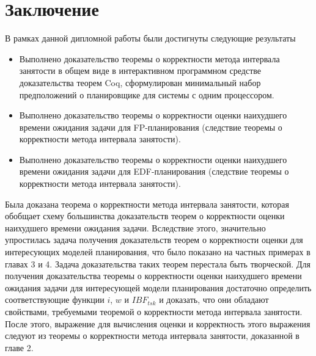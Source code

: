 \section*{Заключение}
В рамках данной дипломной работы были достигнуты следующие результаты
\begin{itemize}
    \item Выполнено доказательство теоремы о корректности метода интервала занятости в общем виде в интерактивном программном средстве доказательства теорем Coq, сформулирован минимальный набор предположений о планировщике для системы с одним процессором.
    \item Выполнено доказательство теоремы о корректности оценки наихудшего времени ожидания задачи для FP-планирования (следствие теоремы о корректности метода интервала занятости).
    \item Выполнено доказательство теоремы о корректности оценки наихудшего времени ожидания задачи для EDF-планирования (следствие теоремы о корректности метода интервала занятости).
\end{itemize}

Была доказана теорема о корректности метода интервала занятости, которая обобщает
  схему большинства доказательств теорем о корректности оценки наихудшего времени ожидания задачи.
  Вследствие этого, значительно упростилась задача получения доказательств теорем
  о корректности оценки для интересующих моделей планирования, что было
  показано на частных примерах в главах 3 и 4. Задача доказательства таких теорем перестала
  быть творческой. Для получения доказательства теоремы о корректности оценки
  наихудшего времени ожидания задачи для интересующей модели
  планирования достаточно определить соответствующие функции $i$, $w$ и $IBF_{tsk}$
  и доказать, что они обладают свойствами, требуемыми теоремой о корректности метода интервала занятости.
  После этого, выражение для
  вычисления оценки и корректность этого выражения следуют из теоремы о корректности
  метода интервала занятости, доказанной в главе 2.
